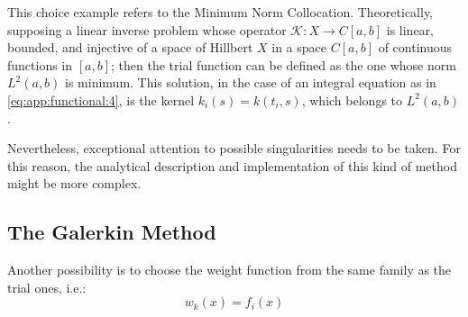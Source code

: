 			This choice example refers to the Minimum Norm Collocation. Theoretically, supposing a linear inverse problem whose operator $\mathcal{K} : X\rightarrow C[a,b]$ is linear, bounded, and injective of a space of Hillbert $X$ in a space $C[a,b]$ of continuous functions in $[a,b]$; then the trial function can be defined as the one whose norm $L^2(a,b)$ is minimum. This solution, in the case of an integral equation as in \eqref{eq:app:functional:4}, is the kernel $k_i(s) = k(t_i,s)$, which belongs to $L^2(a,b)$ \citep{kirsch2011introduction}.
			
			Nevertheless, exceptional attention to possible singularities needs to be taken. For this reason, the analytical description and implementation of this kind of method might be more complex.
		
		\subsection{The Galerkin Method}\label{chap:methods:discretization:galerkin}
			
			Another possibility is to choose the weight function from the same family as the trial ones, i.e.:
			\begin{equation}
				w_k(x) = f_i(x) \label{eq:3:discretization:galerkin:0}
			\end{equation}
		
